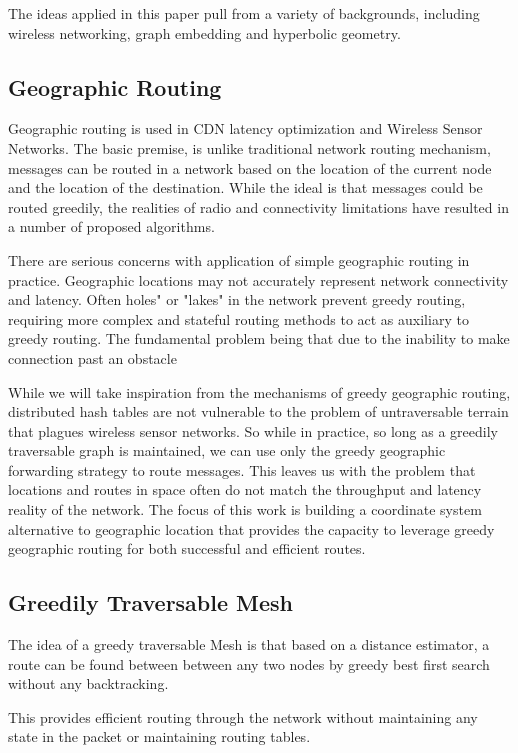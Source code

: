 The ideas applied in this paper pull from a variety of backgrounds, including wireless networking, graph embedding and hyperbolic geometry.

\subsection{Geographic Routing}

Geographic routing is used in CDN latency optimization and Wireless Sensor Networks\cite{karp2000geographic}.
The basic premise, is unlike traditional network routing mechanism, messages can be routed in a network based on the location of the current node and the location of the destination.
While the ideal is that messages could be routed greedily, the realities of radio and connectivity limitations have resulted in a number of proposed algorithms.

There are serious concerns with application of simple geographic routing in practice.
Geographic locations may not accurately represent network connectivity and latency.
Often holes" or "lakes" in the network prevent greedy routing, requiring more complex and stateful routing methods to act as auxiliary to greedy routing.
The fundamental problem being that due to the inability to make connection past an obstacle 

While we will take inspiration from the mechanisms of greedy geographic routing, distributed hash tables are not vulnerable to the problem of untraversable terrain that plagues wireless sensor networks. 
So while in practice, so long as a greedily traversable graph is maintained, we can use only the greedy geographic forwarding strategy to route messages.
This leaves us with the problem that locations and routes in space often do not match the throughput and latency reality of the network.
The focus of this work is building a coordinate system alternative to geographic location that provides the capacity to leverage greedy geographic routing for both successful and efficient routes.

\subsection{Greedily Traversable Mesh}

The idea of a greedy traversable Mesh is that based on a distance estimator, a route can be found between between any two nodes by greedy best first search without any backtracking.

This provides efficient routing through the network without maintaining any state in the packet or maintaining routing tables.

